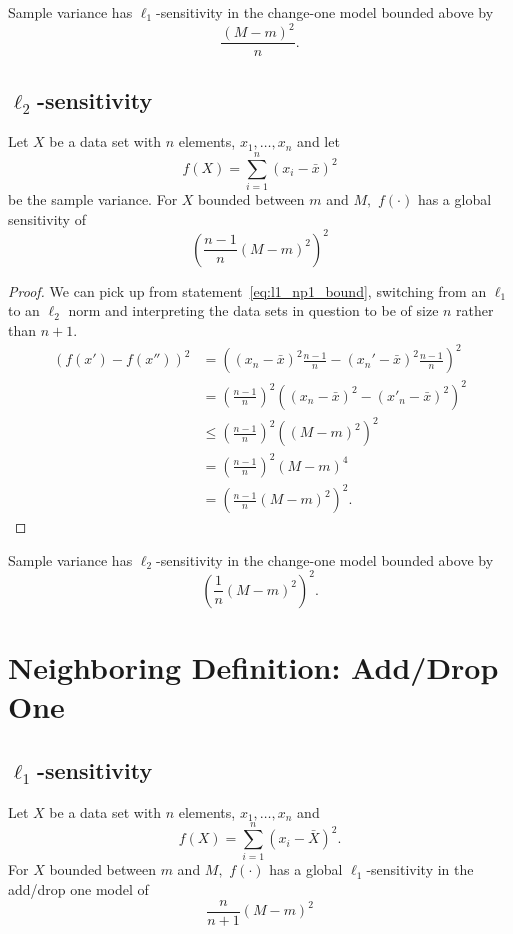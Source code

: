 \documentclass[11pt]{scrartcl} %
\begin{document}
\begin{corollary}
Sample variance has $\ell_1$-sensitivity in the change-one model bounded above by
$$ \frac{(M-m)^2 }{n}. $$
\end{corollary}

\subsection{$\ell_2$-sensitivity}
\begin{theorem}
	Let $X$ be a data set with $n$ elements, $x_1, \hdots, x_n$ and let
	\[ f(X) = \sum_{i=1}^n (x_i - \bar{x})^2 \]
	be the sample variance.
	For $X$ bounded between $m$ and $M,$ $f(\cdot)$ has a global sensitivity of
	\[ \left( \frac{n-1}{n} (M-m)^2 \right)^2 \]
\end{theorem}

\begin{proof}
	We can pick up from statement~\ref{eq:l1_np1_bound}, switching from an $\ell_1$ to an $\ell_2$ norm and interpreting the data sets in question to be of size $n$ rather than $n+1$.
	\begin{align*}
		(f(x') - f(x''))^2
			&= \left( (x_{n}-\bar{x})^2 \frac{n-1}{n} - (x_{n}'-\bar{x})^2 \frac{n-1}{n} \right)^2 \\
			&= \left( \frac{n-1}{n} \right)^2 \left( (x_n - \bar{x})^2 - (x'_n - \bar{x})^2 \right)^2 \\
			&\leq \left( \frac{n-1}{n} \right)^2 \left( (M-m)^2 \right)^2 \\
			&= \left( \frac{n-1}{n} \right)^2 (M - m)^4 \\
			&= \left( \frac{n-1}{n} (M - m)^2 \right)^2.
	\end{align*}
\end{proof}

\begin{corollary}
Sample variance has $\ell_2$-sensitivity in the change-one model bounded above by
$$ \left(\frac{1}{n} (M-m)^2\right)^2.$$ 
\end{corollary}

\section{Neighboring Definition: Add/Drop One}
\subsection{$\ell_1$-sensitivity}
 \begin{theorem}
 \label{thm:l1addsub}
 	Let $X$ be a data set with $n$ elements, $x_1, \hdots, x_n$ and
 	\[ f(X) = \sum_{i=1}^n (x_i - \bar{X})^2. \]
 	For $X$ bounded between $m$ and $M,$ $f(\cdot)$ has a global $\ell_1$-sensitivity in the add/drop one model of
 	\[ \frac{n}{n+1} (M-m)^2 \]
 \end{theorem}
\end{document}
